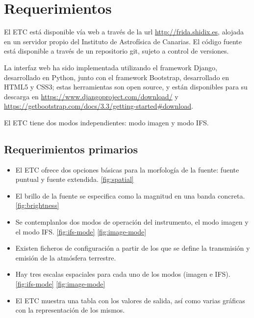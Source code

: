 \section{Requerimientos}
El ETC est\'a disponible v\'ia web a trav\'es de la url \url{http://frida.shidix.es}, alojada en un servidor propio del Instituto de Astrof\'isica de Canarias. El código fuente está disponible a través de un repositorio git, sujeto a control de versiones. 

La interfaz web ha sido implementada utilizando el framework Django, desarrollado en Python, junto con el framework Bootstrap, desarrollado en HTML5 y CSS3; estas herramientas son open source, y están disponibles para su descarga en \url{https://www.djangoproject.com/download/} y \url{https://getbootstrap.com/docs/3.3/getting-started#download}.

El ETC tiene dos modos independientes: modo imagen y modo IFS.

\subsection{Requerimientos primarios}
\begin{itemize}
    \item El ETC ofrece dos opciones b\'asicas para la morfolog\'ia de la fuente: fuente puntual y fuente extendida. \ref{fig:spatial}
    \item El brillo de la fuente se especifica como la magnitud en una banda concreta. \ref{fig:brightness}
    \item Se contemplanlos dos modos de operaci\'on del instrumento, el modo imagen y el modo IFS. \ref{fig:ifs-mode}  \ref{fig:image-mode}
    \item Existen ficheros de configuraci\'on a partir de los que se define la transmisi\'on y emisi\'on de la atm\'osfera terrestre.
    \item Hay tres escalas espaciales para cada uno de los modos (imagen e IFS). \ref{fig:ifs-mode}  \ref{fig:image-mode}
    \item El ETC muestra una tabla con los valores de salida, as\'i como varias gr\'aficas con la representaci\'on de los mismos.

\end{itemize}

